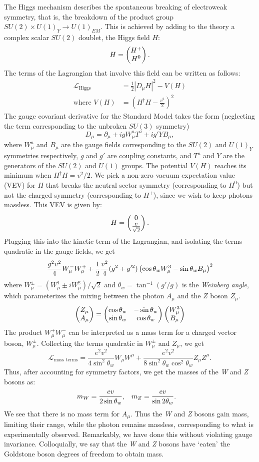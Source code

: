 The Higgs mechanism describes the spontaneous breaking of electroweak symmetry, that is, the breakdown of the product group $SU(2)\times U(1)_Y\rightarrow U(1)_{EM}$. This is achieved by adding to the theory a complex scalar $SU(2)$ doublet, the Higgs field $H$:
\[H = \begin{pmatrix} H^+ \\ H^0\end{pmatrix}.\]
The terms of the Lagrangian that involve this field can be written as follows:
\begin{align}
  \label{eq:higgs_kinetic}
  \mathcal{L}_{\text{Higgs}} &= \frac{1}{2}\left|D_\mu H\right|^2-V(H)\\
  \label{eq:higgs_potential}
  \text{where }V(H) &= \left(H^\dag H-\frac{v^2}{2}\right)^2
\end{align}
The gauge covariant derivative for the Standard Model takes the form (neglecting the term corresponding to the unbroken $SU(3)$ symmetry)
$$D_\mu = \partial_\mu + igW_\mu^aT^a+ig'YB_\mu,$$
where $W_\mu^a$ and $B_\mu$ are the gauge fields corresponding to the $SU(2)$ and $U(1)_Y$ symmetries respectively, \emph{g} and $g'$ are coupling constants, and $T^a$ and $Y$ are the generators of the $SU(2)$ and $U(1)$ groups. The potential $V(H)$ reaches its minimum when $H^\dag H = v^2 / 2$. We pick a non-zero vacuum expectation value (VEV) for $H$ that breaks the neutral sector symmetry (corresponding to $H^0$) but not the charged symmetry (corresponding to $H^{+}$), since we wish to keep photons massless. This VEV is given by:
\[H = \begin{pmatrix} 0 \\ \frac{v}{\sqrt{2}}\end{pmatrix}.\]
Plugging this into the kinetic term of the Lagrangian, and isolating the terms quadratic in the gauge fields, we get
\[\frac{g^2v^2}{4}W_\mu^-W_\mu^++\frac{1}{2}\frac{v^2}{4}(g^2+g'^2)
\left(\cos\theta_w W_\mu^3 - \sin\theta_w B_\mu\right)^2\]
where $W_\mu^\pm = (W_\mu^1\pm iW_\mu^2)/\sqrt{2}$  and $\theta_w = \tan^{-1}(g'/g)$ is the \emph{Weinberg angle}, which parameterizes the mixing between the photon $A_\mu$ and the $Z$ boson $Z_\mu$.
\begin{equation}\label{eq:z_a_mixing}
\begin{pmatrix} Z_\mu \\ A_\mu\end{pmatrix} = \begin{pmatrix} \cos\theta_w & -\sin\theta_w \\ \sin\theta_w & \cos\theta_w\end{pmatrix}
\begin{pmatrix} W_{\mu}^{3} \\ B_{\mu}\end{pmatrix}
\end{equation}
The product $W_\mu^+W_\mu^-$ can be interpreted as a mass term for a charged vector boson, $W_\mu^\pm$. Collecting the terms quadratic in $W_\mu^\pm$ and $Z_\mu$, we get
\[\mathcal{L}_{\text{mass terms}}=\frac{e^2v^2}{4\sin^2\theta_w}W_\mu W^\mu+
\frac{e^2v^2}{8\sin^2\theta_w\cos^2\theta_w}Z_\mu Z^\mu.\]
Thus, after accounting for symmetry factors, we get the masses of the \emph{W} and \emph{Z} bosons as:
\begin{align*}
  m_W &=\frac{ev}{2\sin\theta_w}, & 
  m_Z &=\frac{ev}{\sin2\theta_w}.
\end{align*}
We see that there is no mass term for $A_\mu$. Thus the \emph{W} and \emph{Z} bosons gain mass, limiting their range, while the photon remains massless, corresponding to what is experimentally observed. Remarkably, we have done this without violating gauge invariance. Colloquially, we say that the \emph{W} and \emph{Z} bosons have `eaten' the Goldstone boson degrees of freedom to obtain mass. 

